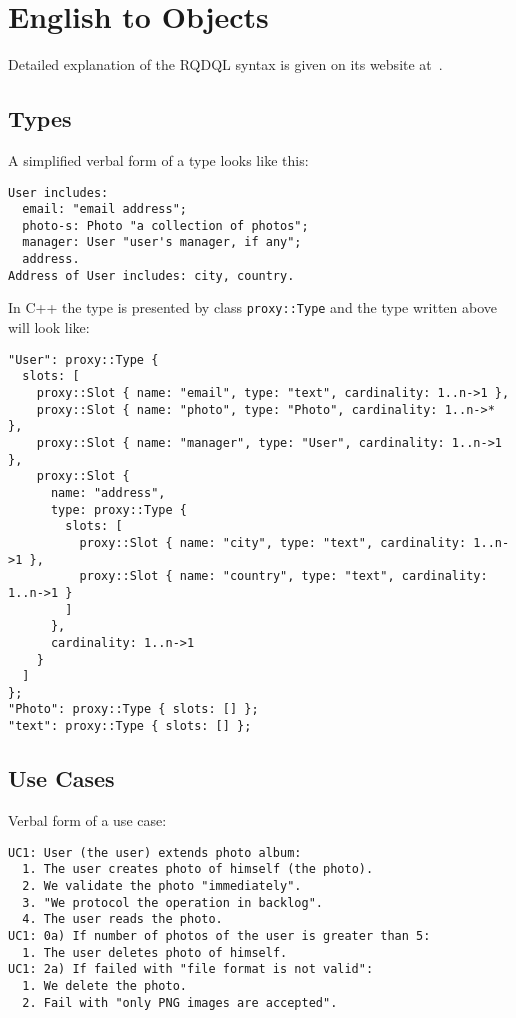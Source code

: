 \documentclass{article}
\begin{document}
\section{English to Objects}\label{sec:to-objects}

    Detailed explanation of the RQDQL syntax is given on its website at~\cite{rqdql}.

    \subsection{Types}

        A simplified verbal form of a type looks like this:

    \begin{verbatim}
User includes:
  email: "email address";
  photo-s: Photo "a collection of photos";
  manager: User "user's manager, if any";
  address.
Address of User includes: city, country.\end{verbatim}

        In C++ the type is presented by class \texttt{proxy::Type} and
        the type written above will look like:
        
    \begin{verbatim}
"User": proxy::Type {
  slots: [
    proxy::Slot { name: "email", type: "text", cardinality: 1..n->1 },
    proxy::Slot { name: "photo", type: "Photo", cardinality: 1..n->* },
    proxy::Slot { name: "manager", type: "User", cardinality: 1..n->1 },
    proxy::Slot { 
      name: "address", 
      type: proxy::Type {
        slots: [
          proxy::Slot { name: "city", type: "text", cardinality: 1..n->1 },
          proxy::Slot { name: "country", type: "text", cardinality: 1..n->1 }
        ]
      }, 
      cardinality: 1..n->1 
    }
  ]
};
"Photo": proxy::Type { slots: [] };
"text": proxy::Type { slots: [] };\end{verbatim}
  
    \subsection{Use Cases}

        Verbal form of a use case:
    
        \begin{verbatim}
UC1: User (the user) extends photo album:
  1. The user creates photo of himself (the photo).
  2. We validate the photo "immediately".
  3. "We protocol the operation in backlog".
  4. The user reads the photo.
UC1: 0a) If number of photos of the user is greater than 5:
  1. The user deletes photo of himself.
UC1: 2a) If failed with "file format is not valid":
  1. We delete the photo.
  2. Fail with "only PNG images are accepted".\end{verbatim}
\end{document}
